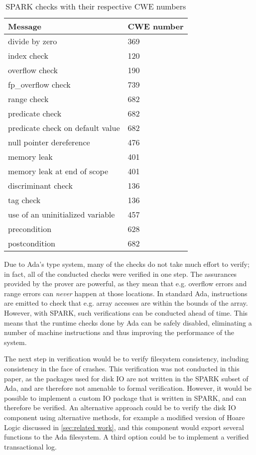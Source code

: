 \begin{table}[tb]
  \centering
  \vspace{1em}
  \renewcommand{\arraystretch}{1.5}
  \begin{tabular}{| l | l |}
    \hline
    \textbf{Message} & \textbf{CWE number} \\ \hline
    divide by zero & 369 \\ \hline
    index check & 120 \\ \hline
    overflow check & 190 \\ \hline
    fp\_overflow check & 739 \\ \hline
    range check & 682 \\ \hline
    predicate check & 682 \\ \hline
    predicate check on default value & 682 \\ \hline
    null pointer dereference & 476 \\ \hline
    memory leak & 401 \\ \hline
    memory leak at end of scope & 401 \\ \hline
    discriminant check & 136 \\ \hline
    tag check & 136 \\ \hline
    use of an uninitialized variable & 457 \\ \hline
    precondition & 628 \\ \hline
    postcondition & 682 \\ \hline
  \end{tabular}
  \renewcommand{\arraystretch}{1}
  \vspace{1em}
  \caption{SPARK checks with their respective CWE numbers}
  \label{tab:checks and cwe numbers}
\end{table}

Due to Ada's type system, many of the checks do not take much effort to verify; in fact, all of the conducted checks were verified in one step.
The assurances provided by the prover are powerful, as they mean that e.g. overflow errors and range errors can \textit{never} happen at those locations.
In standard Ada, instructions are emitted to check that e.g. array accesses are within the bounds of the array.
However, with SPARK, such verifications can be conducted ahead of time.
This means that the runtime checks done by Ada can be safely disabled, eliminating a number of machine instructions and thus improving the performance of the system.

The next step in verification would be to verify filesystem consistency, including consistency in the face of crashes.
This verification was not conducted in this paper, as the packages used for disk IO are not written in the SPARK subset of Ada, and are therefore not amenable to formal verification.
However, it would be possible to implement a custom IO package that is written in SPARK, and can therefore be verified.
An alternative approach could be to verify the disk IO component using alternative methods, for example a modified version of Hoare Logic discussed in \autoref{sec:related work}, and this component would export several functions to the Ada filesystem.
A third option could be to implement a verified transactional log.

